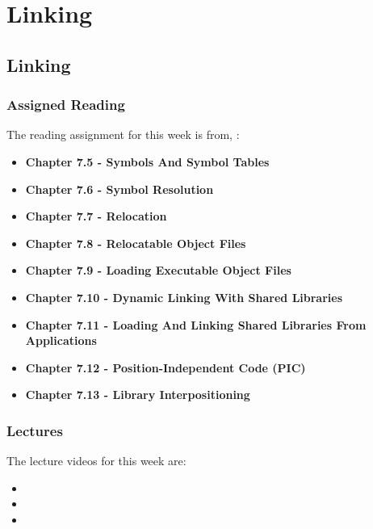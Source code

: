 \clearpage

\renewcommand{\ChapTitle}{Linking}
\renewcommand{\SectionTitle}{Linking}

\chapter{\ChapTitle}

\section{\SectionTitle}

\subsection{Assigned Reading}

The reading assignment for this week is from, \Textbook:

\begin{itemize}
    \item \textbf{Chapter 7.5 - Symbols And Symbol Tables}
    \item \textbf{Chapter 7.6 - Symbol Resolution}
    \item \textbf{Chapter 7.7 - Relocation}
    \item \textbf{Chapter 7.8 - Relocatable Object Files}
    \item \textbf{Chapter 7.9 - Loading Executable Object Files}
    \item \textbf{Chapter 7.10 - Dynamic Linking With Shared Libraries}
    \item \textbf{Chapter 7.11 - Loading And Linking Shared Libraries From Applications}
    \item \textbf{Chapter 7.12 - Position-Independent Code (PIC)}
    \item \textbf{Chapter 7.13 - Library Interpositioning}
\end{itemize}

\subsection{Lectures}

The lecture videos for this week are:

\begin{itemize}
    \item {}
    \item {}
    \item {}
\end{itemize}

